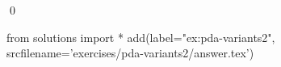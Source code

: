 
\begin{ex} 
  \label{ex:pda-variants2}
  
  \qed
\end{ex} 
\begin{python0}
from solutions import *
add(label="ex:pda-variants2",
    srcfilename='exercises/pda-variants2/answer.tex') 
\end{python0}
